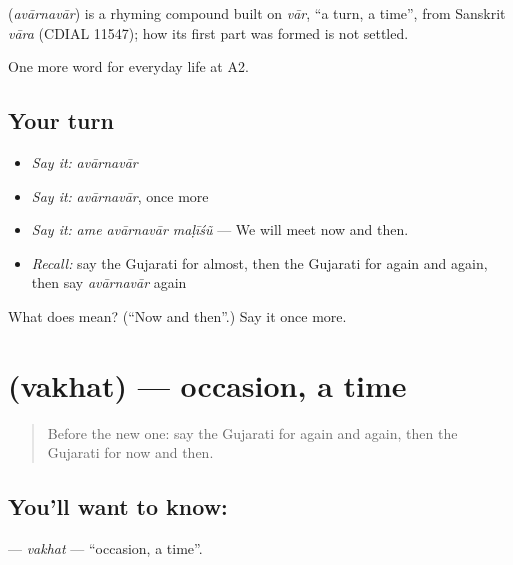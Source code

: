 \begin{cousinweb}
\textbf{} (\emph{avārnavār}) is a rhyming compound built on \emph{vār}, \textquotedblleft{}a turn, a time\textquotedblright{}, from Sanskrit \emph{vāra} (CDIAL 11547); how its first part was formed is not settled.
\end{cousinweb}

\begin{grammarlens}[title={What you've built}]
One more word for everyday life at A2.
\end{grammarlens}

\subsection*{Your turn}
\begin{itemize}
\raggedright
  \item \emph{Say it:} \emph{avārnavār}
  \item \emph{Say it:} \emph{avārnavār}, once more
  \item \emph{Say it:} \emph{ame avārnavār maḷīśũ} — We will meet now and then.
  \item \emph{Recall:} say the Gujarati for almost, then the Gujarati for again and again, then say \emph{avārnavār} again
\end{itemize}

\begin{tcolorbox}[breakable,colback=teal!4,colframe=teal!35!black,title={Before you move on}]
What does  mean? (\textquotedblleft{}Now and then\textquotedblright{}.) Say it once more.
\end{tcolorbox}
\section[\texorpdfstring{\gu{વખત} (vakhat)}{વખત (vakhat)}]{ (vakhat) — occasion, a time}

\label{lesson:GU-C177-vakhat}



\begin{quote}
Before the new one: say the Gujarati for again and again, then the Gujarati for now and then.
\end{quote}

\subsection*{You'll want to know: }
\textbf{} — \emph{vakhat} — \textquotedblleft{}occasion, a time\textquotedblright{}.

